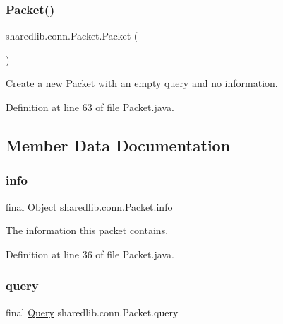 \hypertarget{classsharedlib_1_1conn_1_1_packet_ab897488a0373fc9f3143ac8016f03aba}{}\label{classsharedlib_1_1conn_1_1_packet_ab897488a0373fc9f3143ac8016f03aba} 
\subsubsection{\texorpdfstring{Packet()}{Packet()}\hspace{0.1cm}{\footnotesize\ttfamily [3/3]}}
{\footnotesize\ttfamily sharedlib.\+conn.\+Packet.\+Packet (\begin{DoxyParamCaption}{ }\end{DoxyParamCaption})}

Create a new \hyperlink{classsharedlib_1_1conn_1_1_packet}{Packet} with an empty query and no information. 

Definition at line 63 of file Packet.\+java.



\subsection{Member Data Documentation}
\hypertarget{classsharedlib_1_1conn_1_1_packet_aa2c7723583e1791e8b3a87a3a875245d}{}\label{classsharedlib_1_1conn_1_1_packet_aa2c7723583e1791e8b3a87a3a875245d} 
\subsubsection{\texorpdfstring{info}{info}}
{\footnotesize\ttfamily final Object sharedlib.\+conn.\+Packet.\+info}

The information this packet contains. 

Definition at line 36 of file Packet.\+java.

\hypertarget{classsharedlib_1_1conn_1_1_packet_a4e6ccf75df2c5db9dfbd4460b6f004c3}{}\label{classsharedlib_1_1conn_1_1_packet_a4e6ccf75df2c5db9dfbd4460b6f004c3} 
\subsubsection{\texorpdfstring{query}{query}}
{\footnotesize\ttfamily final \hyperlink{enumsharedlib_1_1conn_1_1_query}{Query} sharedlib.\+conn.\+Packet.\+query}

